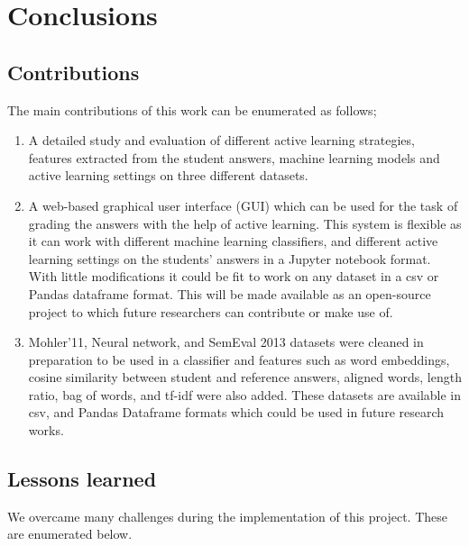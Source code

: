 

    \chapter{Conclusions}

    \section{Contributions}
    
	The main contributions of this work can be enumerated as follows;
	
	\begin{enumerate}
		\item A detailed study and evaluation of different active learning strategies, features extracted from the student answers, machine learning models and active learning settings on three different datasets. 
		
		\item A web-based graphical user interface (GUI) which can be used for the task of grading the answers with the help of active learning. This system is flexible as it can work with different machine learning classifiers, and different active learning settings on the students' answers in a Jupyter notebook format. With little modifications it could be fit to work on any dataset in a csv or Pandas dataframe format. This will be made available as an open-source project to which future researchers can contribute or make use of.
		
		\item Mohler'11, Neural network, and SemEval 2013 datasets were cleaned in preparation to be used in a classifier and features such as word embeddings, cosine similarity between student and reference answers, aligned words, length ratio, bag of words, and tf-idf were also added. These datasets are available in csv, and Pandas Dataframe formats which could be used in future research works.
	\end{enumerate}

    \section{Lessons learned}
    
    We overcame many challenges during the implementation of this project. These are enumerated below.
    
